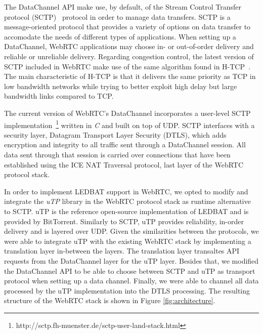 \documentclass{sig-alternate}
\begin{document}

The DataChannel API make use, by default, of the Stream Control Transfer protocol
(SCTP)~\cite{sctp-rfc} protocol in order to manage data transfers. SCTP is a
message-oriented protocol that provides a variety of options on data transfer to
accomodate the needs of different types of applications. When setting up a DataChannel,
WebRTC applications may choose in- or out-of-order delivery and reliable or unreliable
delivery. Regarding congestion control, the latest version of SCTP included in WebRTC make
use of the same algorithm found in H-TCP~\cite{htcp}. The main characteristic of H-TCP is
that it delivers the same priority as TCP in low bandwidth networks while trying to better
exploit high delay but large bandwidth links compared to TCP.

The current version of WebRTC's DataChannel incorporates a user-level SCTP
implementation~\footnote{http://sctp.fh-muenster.de/sctp-user-land-stack.html} written in \textit{C} and built
on top of UDP. SCTP interfaces with a security layer, Datagram Transport Layer Security (DTLS), which adds encryption
and integrity to all traffic sent through a DataChannel session.  All data sent through
that session is carried over connections that have been established using the ICE NAT
Traversal protocol, last layer of the WebRTC protocol stack.


In order to implement LEDBAT support in WebRTC, we opted to modify and integrate the
\textit{uTP} library \cite{utp-repo} in the WebRTC protocol stack as runtime alternative
to SCTP. uTP is the reference open-source implementation of LEDBAT and is provided by
BitTorrent. Similarly to SCTP, uTP provides reliability, in-order delivery and is layered
over UDP. Given the similarities between the protocols, we were able to integrate uTP with
the existing WebRTC stack by implementing a translation layer in-between the layers. The
translation layer transaltes API requests from the DataChannel layer for the uTP
layer. Besides that, we modified the DataChannel API to be able to choose between SCTP and
uTP as transport protocol when setting up a data channel. Finally, we were able to channel
all data processed by the uTP implementation into the DTLS processing. The resulting
structure of the WebRTC stack is shown in Figure \ref{fig:architecture}.
\end{document}
